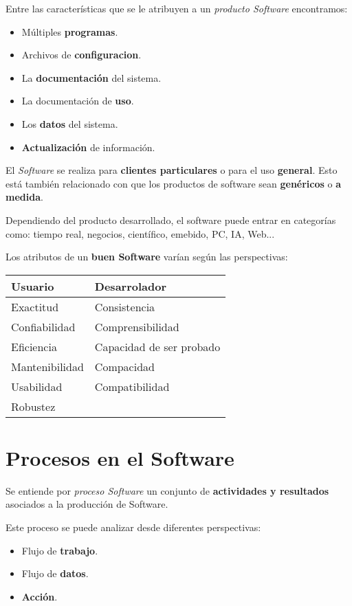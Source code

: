 Entre las características que se le atribuyen a un \emph{producto
  Software} encontramos:
\begin{itemize}[noitemsep]
\item Múltiples \textbf{programas}.
\item Archivos de \textbf{configuracion}.
\item La \textbf{documentación} del sistema.
\item La documentación de \textbf{uso}.
\item Los \textbf{datos} del sistema.
\item \textbf{Actualización} de información.
\end{itemize}

El \textit{Software} se realiza para \textbf{clientes particulares} o
para el uso \textbf{general}. Esto está también relacionado con que
los productos de software sean \textbf{genéricos} o \textbf{a medida}.

Dependiendo del producto desarrollado, el software puede entrar en
categorías como: tiempo real, negocios, científico, emebido, PC, IA,
Web...

Los atributos de un \textbf{buen Software} varían según las perspectivas:
\begin{center}
\begin{tabular}[h]{p{5cm} | p{5cm}}
  \textbf{Usuario} & \textbf{Desarrolador} \\ \hline
  Exactitud & Consistencia \\
  Confiabilidad & Comprensibilidad \\
  Eficiencia & Capacidad de ser probado \\
  Mantenibilidad & Compacidad \\
  Usabilidad & Compatibilidad \\
  Robustez & 
\end{tabular}  
\end{center}

\section{Procesos en el Software}
\label{sec:procesos}

Se entiende por \emph{proceso Software} un conjunto de \textbf{actividades y
  resultados} asociados a la producción de Software.

Este proceso se puede analizar desde diferentes perspectivas:
\begin{itemize}[noitemsep]
\item Flujo de \textbf{trabajo}.
\item Flujo de \textbf{datos}.
\item \textbf{Acción}.
\end{itemize}

